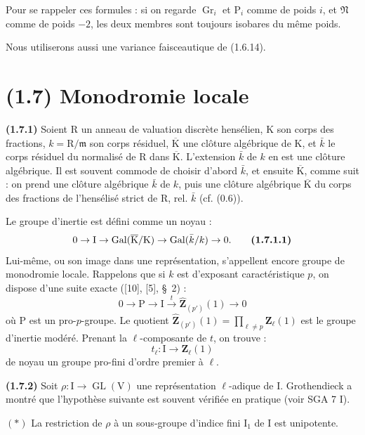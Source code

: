 \documentclass[11pt,leqno]{article}
\begin{document}
Pour se rappeler ces formules : si on regarde \(\operatorname{Gr}_i\) et \(\mathrm{P}_i\) comme de poids \(i\), et \(\mathfrak{N}\) comme de poids \(-2\), les deux membres sont toujours isobares du même poids.

Nous utiliserons aussi une variance faisceautique de (1.6.14).

\section*{(1.7) Monodromie locale}

\textbf{(1.7.1)} Soient \(\mathrm{R}\) un anneau de valuation discrète hensélien, \(\mathrm{K}\) son corps des fractions, \(k=\mathrm{R}/\mathfrak{m}\) son corps résiduel, \(\overline{\mathrm{K}}\) une clôture algébrique de \(\mathrm{K}\), et \(\bar{k}\) le corps résiduel du normalisé de \(\mathrm{R}\) dans \(\overline{\mathrm{K}}\). L’extension \(\bar{k}\) de \(k\) en est une clôture algébrique. Il est souvent commode de choisir d’abord \(\bar{k}\), et ensuite \(\overline{\mathrm{K}}\), comme suit : on prend une clôture algébrique \(\bar{k}\) de \(k\), puis une clôture algébrique \(\overline{\mathrm{K}}\) du corps des fractions de l’hensélisé strict de \(\mathrm{R}\), rel. \(\bar{k}\) (cf. (0.6)).

Le groupe d’inertie est défini comme un noyau :
\[
0\to\mathrm{I}\to
\operatorname{Gal}(\overline{\mathrm{K}}/\mathrm{K})
\to\operatorname{Gal}(\bar{k}/k)\to0.
\tag*{\textbf{(1.7.1.1)}}
\]
Lui-même, ou son image dans une représentation, s’appellent encore groupe de monodromie locale. Rappelons que si \(k\) est d’exposant caractéristique \(p\), on dispose d’une suite exacte ([10], [5], \S~2) :
\[
0\to\mathrm{P}\to\mathrm{I}
\xrightarrow{t}\widehat{\mathbf{Z}}_{(p')}(1)\to0
\]
où \(\mathrm{P}\) est un pro-\(p\)-groupe. Le quotient \(\widehat{\mathbf{Z}}_{(p')}(1)=\prod\limits_{\ell\neq p}\mathbf{Z}_\ell(1)\) est le groupe d’inertie modéré. Prenant la \(\ell\)-composante de \(t\), on trouve :
\[
t_\ell:\mathrm{I}\to\mathbf{Z}_\ell(1)
\]
de noyau un groupe pro-fini d’ordre premier à \(\ell\).

\textbf{(1.7.2)} Soit \(\rho:\mathrm{I}\to\operatorname{GL}(\mathrm{V})\) une représentation \(\ell\)-adique de \(\mathrm{I}\). Grothendieck a montré que l’hypothèse suivante est souvent vérifiée en pratique (voir SGA 7 I).

\((*)\) La restriction de \(\rho\) à un sous-groupe d’indice fini \(\mathrm{I}_1\) de \(\mathrm{I}\) est unipotente.
\end{document}
